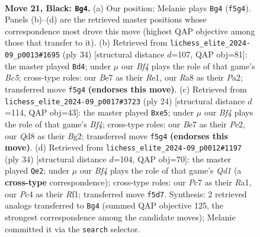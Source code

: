\documentclass[11pt]{article}
\begin{document}
\begin{figure}[p]
\label{fig:thought-m39}
\end{figure}

\clearpage

\begin{figure}[p]\centering
\begin{subfigure}{0.46\textwidth}\centering
\resizebox{\linewidth}{!}{%
\newchessgame
\chessboard[
  setfen={r2q1r2/ppp1b1k1/n4pp1/3P1b1p/P1p2N2/2N5/RPP1RPPP/2BQ2K1 b - - 0 21},
  showmover=false,
  pgfstyle=straightmove, color=movearrow, markmove={f5-g4}
]}
\caption{}
\end{subfigure}\hfill
\begin{subfigure}{0.46\textwidth}\centering
\resizebox{\linewidth}{!}{%
\newchessgame
\chessboard[
  setfen={r3r1k1/pbpq1ppp/5n2/2Bp4/5n2/2PP1B2/P1QN1PPP/4RRK1 w - - 3 18},
  showmover=false,
  pgfstyle=straightmove, color=movearrow, markmove={c5-d4}
]}
\caption{}
\end{subfigure}
\\[4pt]
\begin{subfigure}{0.46\textwidth}\centering
\resizebox{\linewidth}{!}{%
\newchessgame
\chessboard[
  setfen={r4rk1/pp1qbppp/4pn2/4n3/3p1B2/6P1/PP2PPBP/R2Q1RK1 w - - 0 13},
  showmover=false,
  pgfstyle=straightmove, color=movearrow, markmove={f4-e5}
]}
\caption{}
\end{subfigure}\hfill
\begin{subfigure}{0.46\textwidth}\centering
\resizebox{\linewidth}{!}{%
\newchessgame
\chessboard[
  setfen={r4rk1/pp2qpp1/2nb1np1/4p3/N5P1/1P2P2P/PB3PB1/R2Q1RK1 w - - 0 18},
  showmover=false,
  pgfstyle=straightmove, color=movearrow, markmove={d1-e2}
]}
\caption{}
\end{subfigure}
\caption{\textbf{Move 21, Black: \texttt{Bg4}.} (a) Our position; Melanie plays \texttt{Bg4} (\texttt{f5g4}). Panels (b)--(d) are the retrieved master positions whose correspondence most drove this move (highest QAP objective among those that transfer to it). (b) Retrieved from \texttt{lichess\_elite\_2024-09\_p0013\#1695} (ply 34) [structural distance $d$=107, QAP obj=81]: the master played \texttt{Bd4}; under $\mu$ our \emph{Bf4} plays the role of that game's \emph{Bc5}; cross-type roles: our \emph{B}e7 as their \emph{R}e1, our \emph{R}a8 as their \emph{P}a2; transferred move \texttt{f5g4} \textbf{(endorses this move)}. (c) Retrieved from \texttt{lichess\_elite\_2024-09\_p0017\#3723} (ply 24) [structural distance $d$=114, QAP obj=43]: the master played \texttt{Bxe5}; under $\mu$ our \emph{Bf4} plays the role of that game's \emph{Bf4}; cross-type roles: our \emph{B}e7 as their \emph{P}e2, our \emph{Q}d8 as their \emph{B}g2; transferred move \texttt{f5g4} \textbf{(endorses this move)}. (d) Retrieved from \texttt{lichess\_elite\_2024-09\_p0012\#1197} (ply 34) [structural distance $d$=104, QAP obj=70]: the master played \texttt{Qe2}; under $\mu$ our \emph{Bf4} plays the role of that game's \emph{Qd1} (a \textbf{cross-type} correspondence); cross-type roles: our \emph{P}c7 as their \emph{R}a1, our \emph{P}c4 as their \emph{R}f1; transferred move \texttt{f5d7}. Synthesis: 2 retrieved analogs transferred to \texttt{Bg4} (summed QAP objective 125, the strongest correspondence among the candidate moves); Melanie committed it via the \texttt{search} selector.}

\end{figure}
\end{document}
